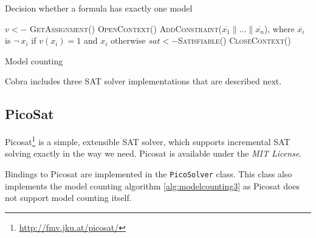 \begin{algorithm}[ht]
\caption{Decision whether a formula has exactly one model}
\label{alg:onlyonemodel}
\DontPrintSemicolon
{}
$v <- $ \textsc{GetAssignment()}\;
\textsc{OpenContext()}\;
\textsc{AddConstraint($\overline{x_1}\| ... \|\overline{x_n}$)},
  where $\overline{x_i}$ is $\neg\:x_i$ if $v(x_i) = 1$ and $x_i$ otherwise\;
$sat <- $\textsc{Satisfiable()}\;
\textsc{CloseContext()}\;
\end{algorithm}
\begin{algorithm}[h!]
\caption{Model counting}
\label{alg:modelcounting3}
\DontPrintSemicolon
{}
\end{algorithm}

Cobra includes three SAT solver implementations that are described next.

\subsection{PicoSat}
Picosat\footnote{\url{http://fmv.jku.at/picosat/}} \cite{picosat} is a simple,
  extensible SAT solver, which supports incremental SAT solving exactly in the way
  we need.
Picosat is available under the \emph{MIT License}.

Bindings to Picosat are implemented in the \texttt{PicoSolver} class.
This class also implements the model counting algorithm \ref{alg:modelcounting3}
 as Picosat does not support model counting itself.

